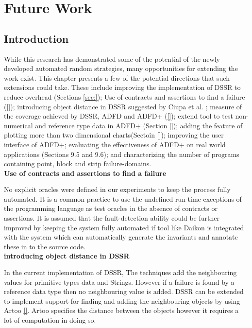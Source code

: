 
\chapter{Future Work}
\label{chap:futureWork}

\section{Introduction}\label{sec:intro8}
	
While this research has demonstrated some of the potential of the newly developed automated random strategies, many opportunities for extending the work exist. This chapter presents a few of the potential directions that such extensions could take. These include improving the implementation of DSSR to reduce overhead (Sections \ref{sec:}); Use of contracts and assertions to find a failure (\ref{}); introducing object distance in DSSR suggested by Ciupa et al. \cite{}; measure of the coverage achieved by DSSR, ADFD and ADFD+ (\ref{}); extend tool to test non-numerical and reference type data in ADFD+ (Section \ref{}); adding the feature of plotting more than two dimensional charts(Sectoin \ref{}); improving the user interface of ADFD+; evaluating the effectiveness of ADFD+ on real world applications (Sections 9.5 and 9.6); and characterizing the number of programs containing point, block and strip failure-domains.\\
	
\textbf{Use of contracts and assertions to find a failure}

No explicit oracles were defined in our experiments to keep the process fully automated. It is a common practice to use the undefined run-time exceptions of the programming language as test oracles in the absence of contracts or assertions. It is assumed that the fault-detection ability could be further improved by keeping the system fully automated if tool like Daikon is integrated with the system which can automatically generate the invariants and annotate these in to the source code.\\

\textbf{introducing object distance in DSSR}

In the current implementation of DSSR, The techniques add the neighbouring values for primitive types data and Strings. However if a failure is found by a reference data type then no neighbouring value is added. DSSR can be extended to implement support for finding and adding the neighbouring objects by using Artoo \ref{}. Artoo specifies the distance between the objects however it requires a lot of computation in doing so.  \\


